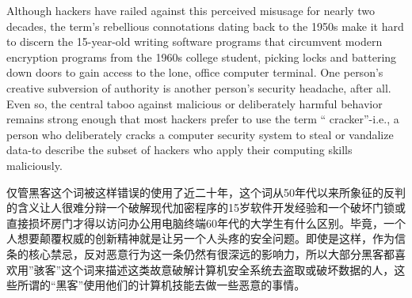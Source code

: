 \ifdefined\eng
Although hackers have railed against this perceived misusage for nearly two decades, the term's rebellious connotations dating back to the 1950s make it hard to discern the 15-year-old writing software programs that circumvent modern encryption programs from the 1960s college student, picking locks and battering down doors to gain access to the lone, office computer terminal. One person's creative subversion of authority is another person's security headache, after all. Even so, the central taboo against malicious or deliberately harmful behavior remains strong enough that most hackers prefer to use the term `` cracker''-i.e., a person who deliberately cracks a computer security system to steal or vandalize data-to describe the subset of hackers who apply their computing skills maliciously.
\fi

\ifdefined\chs
仅管黑客这个词被这样错误的使用了近二十年，这个词从50年代以来所象征的反判的含义让人很难分辩一个破解现代加密程序的15岁软件开发经验和一个破坏门锁或直接损坏房门才得以访问办公用电脑终端60年代的大学生有什么区别。毕竟，一个人想要颠覆权威的创新精神就是让另一个人头疼的安全问题。即使是这样，作为信条的核心禁忌，反对恶意行为这一条仍然有很深远的影响力，所以大部分黑客都喜欢用''骇客''这个词来描述这类故意破解计算机安全系统去盗取或破坏数据的人，这些所谓的``黑客''使用他们的计算机技能去做一些恶意的事情。
\fi





